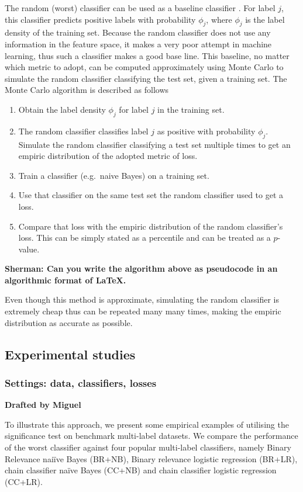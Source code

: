 \documentclass[review]{elsarticle}
\begin{document}
The random (worst) classifier can be used as a baseline classifier . 
For label $j$, this classifier predicts positive labels with probability $\phi_j$, where $\phi_j$ is the label density of the training set. 
Because the random classifier does not use any information in the feature space, it makes a very poor attempt in machine learning, thus such a classifier makes a good base line.
This baseline, no matter which metric to adopt, can be computed approximately using Monte Carlo to simulate the random classifier classifying the test set, given a training set. The Monte Carlo algorithm is described as follows
\begin{enumerate}
	\item Obtain the label density $\phi_j$ for label $j$ in the training set.
	\item The random classifier classifies label $j$ as positive with probability $\phi_j$. Simulate the random classifier classifying a test set multiple times to get an empiric distribution of the adopted metric of loss.
	\item Train a classifier (e.g.~naive Bayes) on a training set.
	\item Use that classifier on the same test set the random classifier used to get a loss.
	\item Compare that loss with the empiric distribution of the random classifier's loss. This can be simply stated as a percentile and can be treated as a $p$-value.
\end{enumerate}
{\bf Sherman: Can you write the algorithm above as pseudocode in an algorithmic format of LaTeX.}

Even though this method is approximate, simulating the random classifier is extremely cheap thus can be repeated many many times, making the empiric distribution as accurate as possible.




\subsection{Experimental studies}\label{ss:experiments}

\subsubsection{Settings: data, classifiers, losses}\label{sss:datasets}

{\bf Drafted by Miguel}

To illustrate this approach, we present some empirical examples of utilising the significance test on benchmark multi-label datasets. We compare the performance of the worst classifier against four popular multi-label classifiers, namely Binary Relevance nai\"ive Bayes (BR+NB), Binary relevance logistic regression (BR+LR), chain classifier na\"ive Bayes (CC+NB) and chain classifier logistic regression (CC+LR).
\end{document}
